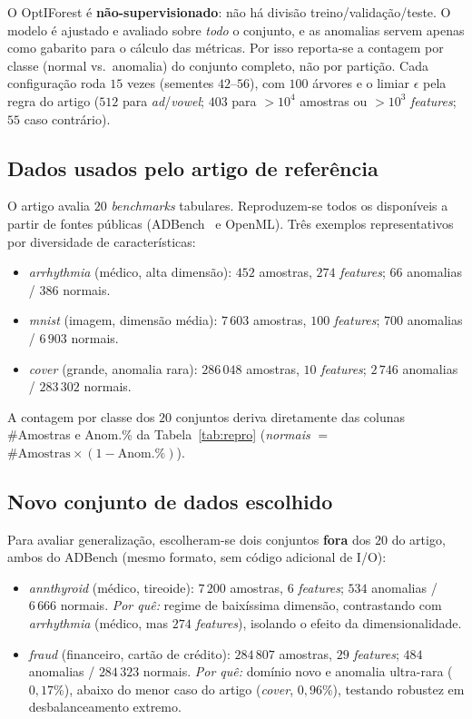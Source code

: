 \documentclass[conference]{IEEEtran}
\begin{document}
O OptIForest \'e \textbf{n\~ao-supervisionado}: n\~ao h\'a divis\~ao
treino/valida\c{c}\~ao/teste. O modelo \'e ajustado e avaliado sobre \emph{todo} o
conjunto, e as anomalias servem apenas como gabarito para o c\'alculo das m\'etricas.
Por isso reporta-se a contagem por classe (normal vs.\ anomalia) do conjunto completo,
n\~ao por parti\c{c}\~ao. Cada configura\c{c}\~ao roda $15$ vezes (sementes $42$--$56$),
com $100$ \'arvores e o limiar $\epsilon$ pela regra do artigo ($512$ para
\emph{ad}/\emph{vowel}; $403$ para $>10^4$ amostras ou $>10^3$ \emph{features};
$55$ caso contr\'ario).

\subsection{Dados usados pelo artigo de refer\^encia}
O artigo avalia $20$ \emph{benchmarks} tabulares. Reproduzem-se todos os
dispon\'iveis a partir de fontes p\'ublicas (ADBench~\cite{adbench} e OpenML). Tr\^es
exemplos representativos por diversidade de caracter\'isticas:
\begin{itemize}
  \item \emph{arrhythmia} (m\'edico, alta dimens\~ao): $452$ amostras, $274$
        \emph{features}; $66$ anomalias / $386$ normais.
  \item \emph{mnist} (imagem, dimens\~ao m\'edia): $7\,603$ amostras, $100$
        \emph{features}; $700$ anomalias / $6\,903$ normais.
  \item \emph{cover} (grande, anomalia rara): $286\,048$ amostras, $10$
        \emph{features}; $2\,746$ anomalias / $283\,302$ normais.
\end{itemize}
A contagem por classe dos $20$ conjuntos deriva diretamente das colunas
\#Amostras e Anom.\% da Tabela~\ref{tab:repro} (\emph{normais} $=$
$\#\text{Amostras}\times(1-\text{Anom.\%})$).

\subsection{Novo conjunto de dados escolhido}
Para avaliar generaliza\c{c}\~ao, escolheram-se dois conjuntos \textbf{fora} dos $20$ do
artigo, ambos do ADBench (mesmo formato, sem c\'odigo adicional de I/O):
\begin{itemize}
  \item \emph{annthyroid} (m\'edico, tireoide): $7\,200$ amostras, $6$
        \emph{features}; $534$ anomalias / $6\,666$ normais. \emph{Por qu\^e:}
        regime de baix\'issima dimens\~ao, contrastando com \emph{arrhythmia}
        (m\'edico, mas $274$ \emph{features}), isolando o efeito da dimensionalidade.
  \item \emph{fraud} (financeiro, cart\~ao de cr\'edito): $284\,807$ amostras, $29$
        \emph{features}; $484$ anomalias / $284\,323$ normais. \emph{Por qu\^e:}
        dom\'inio novo e anomalia ultra-rara ($0{,}17\%$), abaixo do menor caso do
        artigo (\emph{cover}, $0{,}96\%$), testando robustez em desbalanceamento
        extremo.
\end{itemize}
\end{document}
